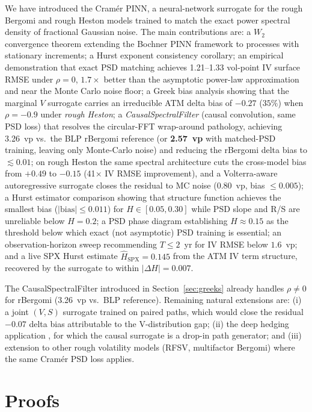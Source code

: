 \documentclass[11pt,a4paper]{article}
\begin{document}
We have introduced the Cramér PINN, a neural-network surrogate for the
rough Bergomi and rough Heston models trained to match the exact power
spectral density of fractional Gaussian noise. The main contributions
are: a $W_2$ convergence theorem extending the Bochner PINN framework to
processes with stationary increments; a Hurst exponent consistency
corollary; an empirical demonstration that exact PSD matching achieves
1.21--1.33 vol-point IV surface RMSE under $\rho = 0$, $1.7\times$
better than the asymptotic power-law approximation and near the Monte
Carlo noise floor; a Greek bias analysis showing that the marginal $V$ surrogate carries
an irreducible ATM delta bias of $-0.27$ ($35\%$) when $\rho = -0.9$
under \emph{rough Heston}; a \emph{CausalSpectralFilter} (causal
convolution, same PSD loss) that resolves the circular-FFT wrap-around
pathology, achieving 3.26~vp vs.\ the BLP rBergomi reference (or
\textbf{2.57~vp} with matched-PSD training, leaving only Monte-Carlo
noise) and reducing the rBergomi delta bias to $\lesssim 0.01$; on rough
Heston the same spectral architecture cuts the cross-model bias from
$+0.49$ to $-0.15$ (41$\times$ IV RMSE improvement), and a
Volterra-aware autoregressive surrogate closes the residual to MC noise
(0.80~vp, bias $\leq 0.005$); a Hurst estimator comparison showing that
structure function achieves the smallest bias ($|\text{bias}|\leq 0.011$)
for $H\in[0.05,0.30]$ while PSD slope and R/S are unreliable below $H=0.2$;
a PSD phase diagram establishing $H\approx 0.15$ as the threshold below
which exact (not asymptotic) PSD training is essential; an observation-horizon
sweep recommending $T\leq 2$~yr for IV RMSE below $1.6$~vp; and a live SPX
Hurst estimate $\hat{H}_\mathrm{SPX}=0.145$ from the ATM IV term structure,
recovered by the surrogate to within $|\Delta H|=0.007$.

The CausalSpectralFilter introduced in Section~\ref{sec:greeks} already
handles $\rho \neq 0$ for rBergomi (3.26~vp vs.\ BLP reference).
Remaining natural extensions are: (i) a joint $(V, S)$ surrogate trained
on paired paths, which would close the residual $-0.07$ delta bias
attributable to the V-distribution gap; (ii) the deep hedging application
\citep{buhler2019deep}, for which the causal surrogate is a drop-in path
generator; and (iii) extension to other rough volatility models (RFSV,
multifactor Bergomi) where the same Cramér PSD loss applies.

\appendix
\section{Proofs}
\end{document}
